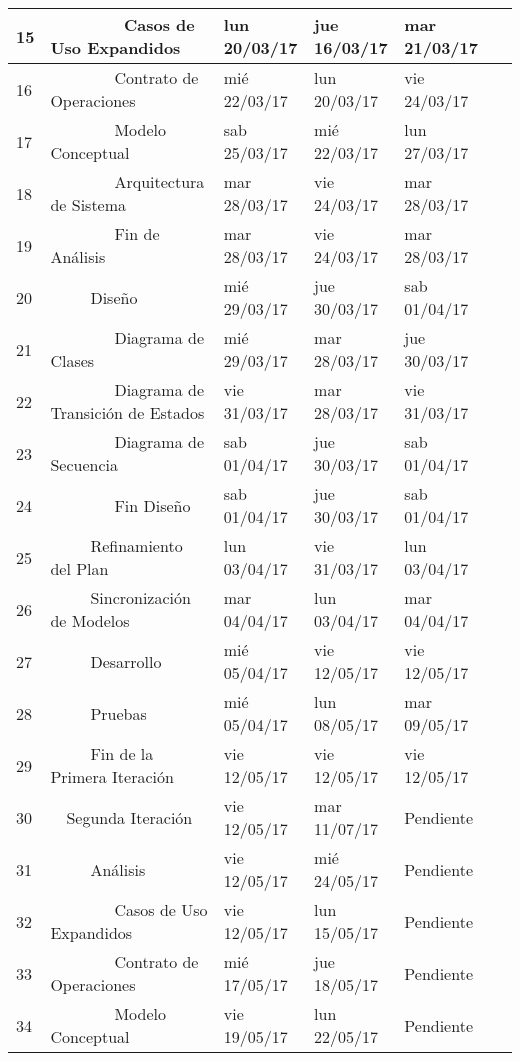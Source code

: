 \begin{center}
\begin{longtable}{ l l l l l l}
	15 &         Casos de Uso Expandidos & lun 20/03/17 & jue 16/03/17 & mar 21/03/17 & \  \\ \hline
	16 &         Contrato de Operaciones & mié 22/03/17 & lun 20/03/17 & vie 24/03/17 & \  \\ \hline
	17 &         Modelo Conceptual & sab 25/03/17 & mié 22/03/17 & lun 27/03/17 & \  \\ \hline
	18 &         Arquitectura de Sistema & mar 28/03/17 & vie 24/03/17 & mar 28/03/17 & \  \\ \hline
	19 &         Fin de Análisis & mar 28/03/17 & vie 24/03/17 & mar 28/03/17 & \  \\ \hline
	20 &      Diseño & mié 29/03/17 & jue 30/03/17 & sab 01/04/17 & \  \\ \hline
	21 &         Diagrama de Clases & mié 29/03/17 & mar 28/03/17 & jue 30/03/17 & \  \\ \hline
	22 &         Diagrama de Transición de Estados & vie 31/03/17 & mar 28/03/17 & vie 31/03/17 & \  \\ \hline
	23 &         Diagrama de Secuencia & sab 01/04/17 & jue 30/03/17 & sab 01/04/17 & \  \\ \hline
	24 &         Fin Diseño & sab 01/04/17 & jue 30/03/17 & sab 01/04/17 & \  \\ \hline
	25 &      Refinamiento del Plan & lun 03/04/17 & vie 31/03/17 & lun 03/04/17 & \  \\ \hline
	26 &      Sincronización de Modelos & mar 04/04/17 & lun 03/04/17 & mar 04/04/17 & \  \\ \hline
	27 &      Desarrollo & mié 05/04/17 & vie 12/05/17 & vie 12/05/17 & \  \\ \hline
	28 &      Pruebas & mié 05/04/17 & lun 08/05/17 & mar 09/05/17 & \  \\ \hline
	29 &      Fin de la Primera Iteración & vie 12/05/17 & vie 12/05/17 & vie 12/05/17 & \  \\ \hline
	30 &   Segunda Iteración & vie 12/05/17 & mar 11/07/17 & Pendiente & \  \\ \hline
	31 &      Análisis & vie 12/05/17 & mié 24/05/17 & Pendiente & \  \\ \hline
	32 &         Casos de Uso Expandidos & vie 12/05/17 & lun 15/05/17 & Pendiente & \  \\ \hline
	33 &         Contrato de Operaciones & mié 17/05/17 & jue 18/05/17 & Pendiente & \  \\ \hline
	34 &         Modelo Conceptual & vie 19/05/17 & lun 22/05/17 & Pendiente & \  \\ \hline

\end{longtable}
\end{center}
